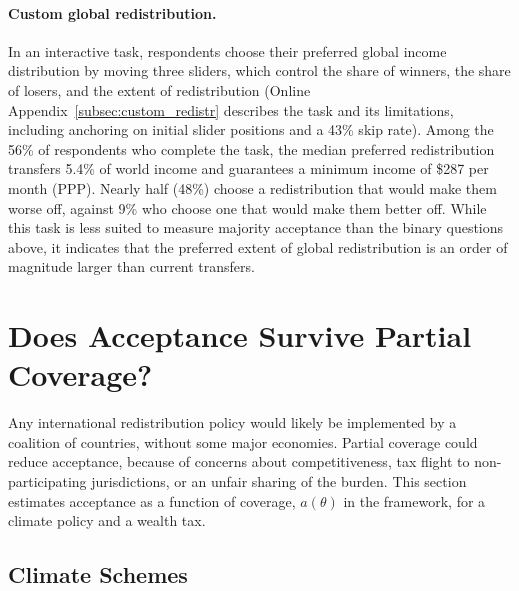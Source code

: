 \documentclass[12pt,english]{article}
\begin{document}
\paragraph{Custom global redistribution.} In an interactive task, respondents choose their preferred global income distribution by moving three sliders, which control the share of winners, the share of losers, and the extent of redistribution (Online Appendix~\ref{subsec:custom_redistr} describes the task and its limitations, including anchoring on initial slider positions and a 43\% skip rate). Among the 56\% of respondents who complete the task, the median preferred redistribution transfers 5.4\% of world income and guarantees a minimum income of \$287 per month (PPP). Nearly half (48\%) choose a redistribution that would make them worse off, against 9\% who choose one that would make them better off. While this task is less suited to measure majority acceptance than the binary questions above, it indicates that the preferred extent of global redistribution is an order of magnitude larger than current transfers.

\section{Does Acceptance Survive Partial Coverage?}\label{sec:coverage}

Any international redistribution policy would likely be implemented by a coalition of countries, without some major economies. Partial coverage could reduce acceptance, because of concerns about competitiveness, tax flight to non-participating jurisdictions, or an unfair sharing of the burden. This section estimates acceptance as a function of coverage, $a(\theta)$ in the framework, for a climate policy and a wealth tax.

\subsection{Climate Schemes}\label{subsec:ics}
\end{document}
